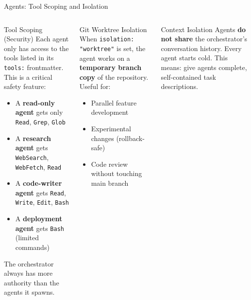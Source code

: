 \documentclass[aspectratio=169,xcolor=dvipsnames]{beamer}
\begin{document}
\begin{frame}{Agents: Tool Scoping and Isolation}
    \begin{columns}
        \begin{block}{Tool Scoping (Security)}
            Each agent only has access to the tools listed in its \texttt{tools:} frontmatter. This is a critical safety feature:
            \begin{itemize}
                \item A \textbf{read-only agent} gets only \texttt{Read}, \texttt{Grep}, \texttt{Glob}
                \item A \textbf{research agent} gets \texttt{WebSearch}, \texttt{WebFetch}, \texttt{Read}
                \item A \textbf{code-writer agent} gets \texttt{Read}, \texttt{Write}, \texttt{Edit}, \texttt{Bash}
                \item A \textbf{deployment agent} gets \texttt{Bash} (limited commands)
            \end{itemize}
            The orchestrator always has more authority than the agents it spawns.
        \end{block}

        \begin{block}{Git Worktree Isolation}
            When \texttt{isolation: "worktree"} is set, the agent works on a \textbf{temporary branch copy} of the repository. Useful for:
            \begin{itemize}
                \item Parallel feature development
                \item Experimental changes (rollback-safe)
                \item Code review without touching main branch
            \end{itemize}
        \end{block}
        \begin{alertblock}{Context Isolation}
            Agents \textbf{do not share} the orchestrator's conversation history. Every agent starts cold. This means: give agents complete, self-contained task descriptions.
        \end{alertblock}
    \end{columns}
\end{frame}
\end{document}
